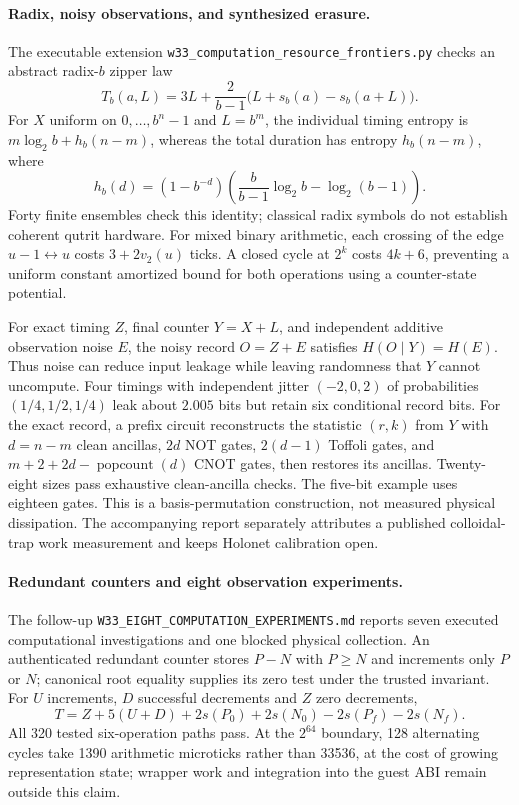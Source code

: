 \paragraph{Radix, noisy observations, and synthesized erasure.}
The executable extension
\texttt{w33\_computation\_resource\_frontiers.py} checks an abstract radix-$b$
zipper law
\[
 T_b(a,L)=3L+\frac{2}{b-1}\bigl(L+s_b(a)-s_b(a+L)\bigr).
\]
For $X$ uniform on $0,\ldots,b^n-1$ and $L=b^m$, the individual timing entropy
is $m\log_2 b+h_b(n-m)$, whereas the total duration has entropy $h_b(n-m)$,
where
\[
 h_b(d)=(1-b^{-d})\left(\frac{b}{b-1}\log_2 b-\log_2(b-1)\right).
\]
Forty finite ensembles check this identity; classical radix symbols do not
establish coherent qutrit hardware. For mixed binary arithmetic, each crossing
of the edge $u-1\leftrightarrow u$ costs $3+2v_2(u)$ ticks. A closed cycle at
$2^k$ costs $4k+6$, preventing a uniform constant amortized bound for both
operations using a counter-state potential.

For exact timing $Z$, final counter $Y=X+L$, and independent additive observation
noise $E$, the noisy record $O=Z+E$ satisfies $H(O\mid Y)=H(E)$.
Thus noise can reduce input leakage while leaving randomness that $Y$ cannot
uncompute. Four timings with independent jitter $(-2,0,2)$ of probabilities
$(1/4,1/2,1/4)$ leak about $2.005$ bits but retain six conditional record bits.
For the exact record, a prefix circuit reconstructs the statistic $(r,k)$ from
$Y$ with $d=n-m$ clean ancillas, $2d$ NOT gates, $2(d-1)$ Toffoli gates, and
$m+2+2d-\operatorname{popcount}(d)$ CNOT gates, then restores its ancillas.
Twenty-eight sizes pass exhaustive clean-ancilla checks. The five-bit example
uses eighteen gates. This is a basis-permutation construction, not measured
physical dissipation. The accompanying report separately attributes a published
colloidal-trap work measurement and keeps Holonet calibration open.

\paragraph{Redundant counters and eight observation experiments.}
The follow-up \texttt{W33\_EIGHT\_COMPUTATION\_EXPERIMENTS.md} reports seven
executed computational investigations and one blocked physical collection.
An authenticated redundant counter stores $P-N$ with $P\geq N$ and increments
only $P$ or $N$; canonical root equality supplies its zero test under the trusted
invariant. For $U$ increments, $D$ successful decrements and $Z$ zero decrements,
\[
 T=Z+5(U+D)+2s(P_0)+2s(N_0)-2s(P_f)-2s(N_f).
\]
All 320 tested six-operation paths pass. At the $2^{64}$ boundary, 128 alternating
cycles take 1390 arithmetic microticks rather than 33536, at the cost of growing
representation state; wrapper work and integration into the guest ABI remain
outside this claim.

